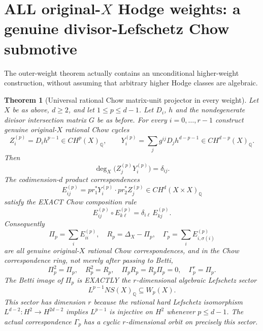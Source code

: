 \documentclass[11pt]{article}
\newtheorem{theorem}{Theorem}
\begin{document}
\section{ALL original-$X$ Hodge weights: a genuine divisor-Lefschetz Chow submotive}

The outer-weight theorem actually contains an unconditional
higher-weight construction, without assuming that arbitrary higher
Hodge classes are algebraic.

\begin{theorem}[Universal rational Chow matrix-unit projector in every weight]
Let $X$ be as above, $d\ge2$, and let
$1\le p\le d-1$. Let $D_i$, $h$ and the
nondegenerate divisor intersection matrix $G$ be as before.
For every $i=0,\ldots,r-1$ construct \emph{genuine original-$X$}
rational Chow cycles
\[
Z_i^{(p)}=D_i h^{p-1}\in CH^p(X)_{\mathbb Q},
\qquad
Y_i^{(p)}=\sum_j g^{ij}D_j h^{d-p-1}
\in CH^{d-p}(X)_{\mathbb Q}.
\]
Then
\[
\deg_X\bigl(Z_j^{(p)}Y_i^{(p)}\bigr)=\delta_{ij}.
\]
The codimension-$d$ product correspondences
\[
E_{ij}^{(p)}=
pr_1^*Y_i^{(p)}\cdot pr_2^*Z_j^{(p)}
\in CH^d(X\times X)_{\mathbb Q}
\]
satisfy the EXACT Chow composition rule
\[
\boxed{
E_{ij}^{(p)}\circ E_{k\ell}^{(p)}
=\delta_{i\ell}\,E_{kj}^{(p)}.
}
\]
Consequently
\[
\Pi_p=\sum_i E_{ii}^{(p)},\quad
R_p=\Delta_X-\Pi_p,\quad
\Gamma_p=\sum_i E_{i,\sigma(i)}^{(p)}
\]
are all genuine original-$X$ rational Chow correspondences,
and in the \emph{Chow correspondence ring}, not merely after passing to Betti,
\[
\boxed{\Pi_p^2=\Pi_p,\quad R_p^2=R_p,\quad
\Pi_p R_p=R_p\Pi_p=0,\quad \Gamma_p^r=\Pi_p.}
\]
The Betti image of $\Pi_p$ is EXACTLY the
$r$-dimensional algebraic Lefschetz sector
\[
L^{p-1}NS(X)_{\mathbb Q}\subseteq W_p(X).
\]
This sector has dimension $r$ because the rational hard Lefschetz
isomorphism $L^{d-2}:H^2\to H^{2d-2}$ implies
$L^{p-1}$ is injective on $H^2$ whenever $p\le d-1$.
The actual correspondence $\Gamma_p$ has a cyclic
$r$-dimensional orbit on precisely this sector.
\end{theorem}
\end{document}
